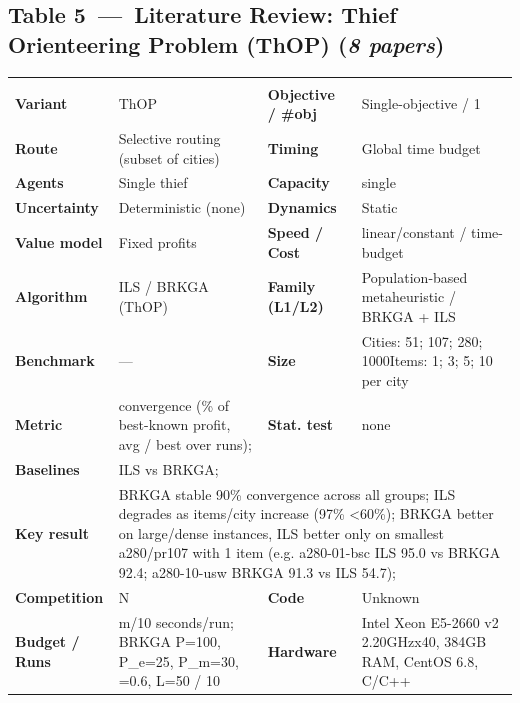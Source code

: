 \documentclass[
  a4paper,
  11pt,
  headings=small,
  numbers=noenddot,
  abstract=on,
  parskip=half,
]{scrartcl}
\begin{document}
\begin{landscape}
\section*{Table 5~---~Literature Review: Thief Orienteering Problem (ThOP) \quad\normalfont(\textit{8 papers})}
\renewcommand{\arraystretch}{1.15}\footnotesize
\begin{longtable}{@{}p{2.6cm}p{8.7cm}p{2.6cm}p{8.7cm}@{}}
\endfirsthead\endhead
\rowcolor{NavyLight}\multicolumn{4}{@{}p{22.7cm}@{}}{\textbf{[1]~\cite{santos2018thief}} --- \textit{The Thief Orienteering Problem: Formulation and Heuristic Approaches}}\\
\textbf{Variant} & ThOP & \textbf{Objective / \#obj} & Single-objective / 1 \\
\textbf{Route} & Selective routing (subset of cities) & \textbf{Timing} & Global time budget \\
\textbf{Agents} & Single thief & \textbf{Capacity} & single \\
\textbf{Uncertainty} & Deterministic (none) & \textbf{Dynamics} & Static \\
\textbf{Value model} & Fixed profits & \textbf{Speed / Cost} & linear/constant / time-budget \\
\textbf{Algorithm} & ILS / BRKGA (ThOP) & \textbf{Family (L1/L2)} & Population-based metaheuristic / BRKGA + ILS \\
\textbf{Benchmark} & --- & \textbf{Size} & Cities: 51; 107; 280; 1000\newline Items: 1; 3; 5; 10 per city \\
\textbf{Metric} & convergence (\% of best-known profit, avg / best over runs); & \textbf{Stat. test} & none \\
\textbf{Baselines} & \multicolumn{3}{p{20.0cm}}{ILS vs BRKGA;} \\
\textbf{Key result} & \multicolumn{3}{p{20.0cm}}{BRKGA stable 90\% convergence across all groups; ILS degrades as items/city increase (97\% <60\%); BRKGA better on large/dense instances, ILS better only on smallest a280/pr107 with 1 item (e.g. a280-01-bsc ILS 95.0 vs BRKGA 92.4; a280-10-usw BRKGA 91.3 vs ILS 54.7);} \\
\textbf{Competition} & N & \textbf{Code} & Unknown \\
\textbf{Budget / Runs} & m/10 seconds/run; BRKGA P=100, P\_e=25, P\_m=30, =0.6, L=50 / 10 & \textbf{Hardware} & Intel Xeon E5-2660 v2 2.20GHzx40, 384GB RAM, CentOS 6.8, C/C++ \\

\end{longtable}
\end{landscape}
\end{document}
